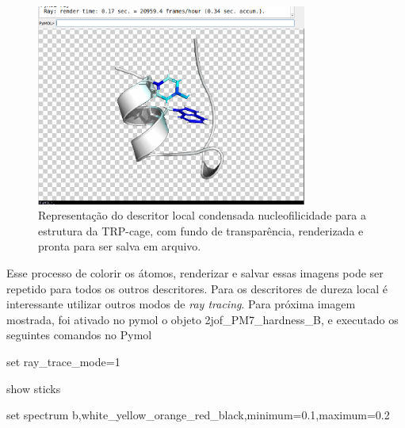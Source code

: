 \documentclass[a4paper,11pt]{refart}
\begin{document}
\hspace*{-\leftmarginwidth}
\begin{minipage}{\fullwidth}
	\begin{figure}[H]
		\begin{center}
			\includegraphics[width=3.5in]{images/tut3_img11}
			\caption{Representação do descritor local condensada nucleofilicidade para a estrutura da TRP-cage, com fundo de transparência, renderizada e pronta para ser salva em arquivo.}
			\label{fig_tut3_9}
		\end{center}
	\end{figure}
\end{minipage}

Esse processo de colorir os átomos, renderizar e salvar essas imagens pode ser repetido para todos os outros descritores. Para os descritores de dureza local é interessante utilizar outros modos de \emph{ray tracing}. Para próxima imagem mostrada, foi ativado no pymol o objeto 2jof\_PM7\_hardness\_B, e executado os seguintes comandos no Pymol

\hspace*{-\leftmarginwidth}
\begin{minipage}{\fullwidth}
	\begin{pymol}set ray_trace_mode=1\end{pymol}
\end{minipage}

\hspace*{-\leftmarginwidth}
\begin{minipage}{\fullwidth}
	\begin{pymol}show sticks\end{pymol}
\end{minipage}

\hspace*{-\leftmarginwidth}
\begin{minipage}{\fullwidth}
	\begin{pymol}set spectrum b,white_yellow_orange_red_black,minimum=0.1,maximum=0.2\end{pymol}
\end{minipage}
\end{document}
